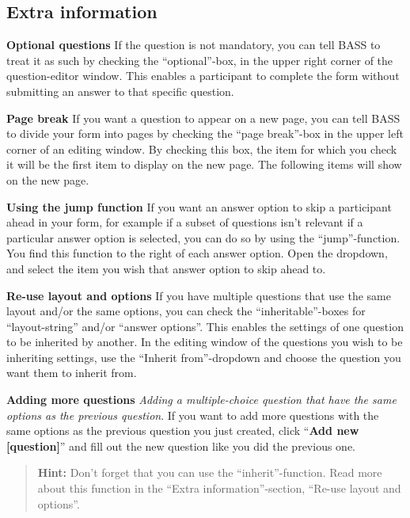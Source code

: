 \documentclass[]{book}
\begin{document}
\hypertarget{extra-information}{%
\subsection{Extra information}\label{extra-information}}

\textbf{Optional questions}
If the question is not mandatory, you can tell BASS to treat it as such by checking the ``optional''-box, in the upper right corner of the question-editor window. This enables a participant to complete the form without submitting an answer to that specific question.

\textbf{Page break}
If you want a question to appear on a new page, you can tell BASS to divide your form into pages by checking the ``page break''-box in the upper left corner of an editing window. By checking this box, the item for which you check it will be the first item to display on the new page. The following items will show on the new page.

\textbf{Using the jump function}
If you want an answer option to skip a participant ahead in your form, for example if a subset of questions isn't relevant if a particular answer option is selected, you can do so by using the ``jump''-function. You find this function to the right of each answer option. Open the dropdown, and select the item you wish that answer option to skip ahead to.

\textbf{Re-use layout and options}
If you have multiple questions that use the same layout and/or the same options, you can check the ``inheritable''-boxes for ``layout-string'' and/or ``answer options''. This enables the settings of one question to be inherited by another. In the editing window of the questions you wish to be inheriting settings, use the ``Inherit from''-dropdown and choose the question you want them to inherit from.

\textbf{Adding more questions}
\emph{Adding a multiple-choice question that have the same options as the previous question}.
If you want to add more questions with the same options as the previous question you just created, click ``\textbf{Add new {[}question{]}}'' and fill out the new question like you did the previous one.

\begin{quote}
\textbf{Hint:} Don't forget that you can use the ``inherit''-function. Read more about this function in the ``Extra information''-section, ``Re-use layout and options''.
\end{quote}
\end{document}
